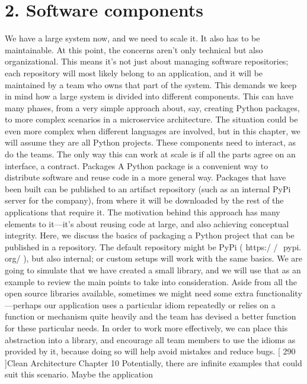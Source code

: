 \documentclass[a4paper,10pt,english]{sphinxmanual}
\begin{document}
\section{2. Software components}
\label{\detokenize{chapters/10_clean_architecture/index:software-components}}
We have a large system now, and we need to scale it. It also has to be maintainable. At this
point, the concerns aren’t only technical but also organizational. This means it’s not just
about managing software repositories; each repository will most likely belong to an
application, and it will be maintained by a team who owns that part of the system.
This demands we keep in mind how a large system is divided into different components.
This can have many phases, from a very simple approach about, say, creating Python
packages, to more complex scenarios in a microservice architecture.
The situation could be even more complex when different languages are involved, but in
this chapter, we will assume they are all Python projects.
These components need to interact, as do the teams. The only way this can work at scale is
if all the parts agree on an interface, a contract.
Packages
A Python package is a convenient way to distribute software and reuse code in a more
general way. Packages that have been built can be published to an artifact repository (such
as an internal PyPi server for the company), from where it will be downloaded by the rest
of the applications that require it.
The motivation behind this approach has many elements to it—it’s about reusing code at
large, and also achieving conceptual integrity.
Here, we discuss the basics of packaging a Python project that can be published in a
repository. The default repository might be PyPi ( https:/​ / ​ pypi.​ org/​ ), but also internal; or
custom setups will work with the same basics.
We are going to simulate that we have created a small library, and we will use that as an
example to review the main points to take into consideration.
Aside from all the open source libraries available, sometimes we might need some extra
functionality—perhaps our application uses a particular idiom repeatedly or relies on a
function or mechanism quite heavily and the team has devised a better function for these
particular needs. In order to work more effectively, we can place this abstraction into a
library, and encourage all team members to use the idioms as provided by it, because doing
so will help avoid mistakes and reduce bugs.
{[} 290 {]}Clean Architecture
Chapter 10
Potentially, there are infinite examples that could suit this scenario. Maybe the application
\end{document}
